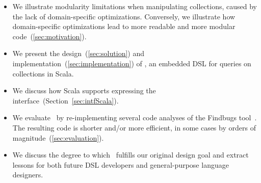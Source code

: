 \begin{itemize}
\item We illustrate modularity limitations when manipulating collections, caused by the lack of domain-specific optimizations. Conversely, we illustrate how domain-specific optimizations lead to more readable and more modular code~(\cref{sec:motivation}).
\item We present the design~(\cref{sec:solution}) and implementation~(\cref{sec:implementation}) of \LoS, an embedded DSL for queries on collections in Scala.
\item We discuss how Scala supports expressing the interface~(Section~\ref{sec:intfScala}).
 \item We evaluate \LoS\ by re-implementing several code analyses of the Findbugs tool~\citep{DBLP:journals/sigplan/HovemeyerP04}.
 The resulting code is shorter and/or more efficient, in some cases by orders of magnitude~(\cref{sec:evaluation}).
 \item We discuss the degree to which \LoS\ fulfills our original design goal and extract lessons for
 both future DSL developers and general-purpose language designers. %
\end{itemize}


